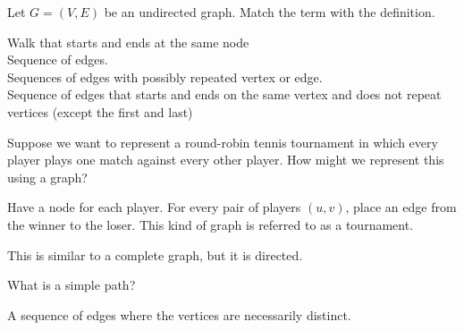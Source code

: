 \question Let $G=(V, E)$ be an undirected graph. Match the term with the definition. \newline
\noindent{}


\begin{solution}
  Walk that starts and ends at the same node \\
  Sequence of edges. \\
  Sequences of edges with possibly repeated vertex or edge.\\
  Sequence of edges that starts and ends on the same vertex and 
does not repeat vertices (except the first and last)
\end{solution}

\question  Suppose we want to represent a round-robin tennis tournament in which every player plays one match against every other player. How might we represent this using a graph?
\begin{solution}[1 in]
Have a node for each player. For every pair of players $(u, v)$, place an edge from the winner to the loser. This kind of graph is referred to as a tournament. 

This is similar to a complete graph, but it is directed.
\end{solution}

\question  What is a simple path?
\begin{solution}[1 in]
A sequence of edges where the vertices are necessarily distinct.
\end{solution}